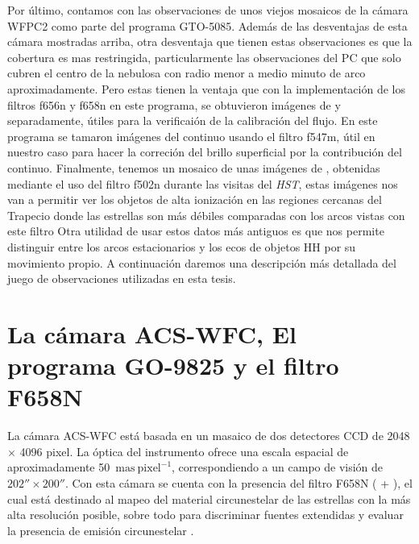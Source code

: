 Por último, contamos con  las observaciones de unos viejos mosaicos de la cámara WFPC2 como parte del programa GTO-5085. Además de las desventajas de esta cámara mostradas arriba, otra desventaja que tienen estas observaciones es que la cobertura es mas restringida, particularmente las observaciones del PC que solo cubren el centro de la nebulosa con radio menor a medio minuto de arco aproximadamente. Pero estas tienen la ventaja que con la implementación de los filtros f656n y f658n en este programa, se obtuvieron imágenes de \ha{} y \nii{} separadamente, útiles para la verificaión de la calibración del flujo. En este programa se tamaron imágenes del continuo usando el filtro f547m, útil en nuestro caso para hacer la correción del brillo superficial por la contribución del continuo. Finalmente, tenemos un mosaico de unas imágenes de \oiii{}, obtenidas mediante el uso del filtro f502n durante las visitas del \textit{HST}, estas imágenes nos van a permitir ver los objetos de alta ionización en las regiones cercanas del Trapecio donde las estrellas son más débiles comparadas con los arcos vistas con este filtro Otra utilidad de usar estos datos más antiguos es que nos permite distinguir entre los arcos estacionarios y los ecos de objetos HH por su movimiento propio. A continuación daremos una descripción más detallada del juego de observaciones utilizadas en esta tesis.        

\section{La cámara ACS-WFC, El programa GO-9825 y el filtro F658N }
\label{sec:acs}

La cámara ACS-WFC está basada en un masaico de dos detectores CCD de 2048 \(\times\) 4096 pixel. La óptica del instrumento ofrece una escala espacial de aproximadamente 50~\(\mathrm{mas~pixel^{-1}}\), correspondiendo a un campo de visión  de \(202'' \times 200''\). Con esta cámara se cuenta con la presencia del filtro F658N (\ha{} + \nii{}), el cual está destinado al mapeo del material circunestelar de las estrellas con la más alta resolución posible, sobre todo para discriminar fuentes extendidas y evaluar la presencia de emisión circunestelar \citep{Robberto:2013a}.\\

